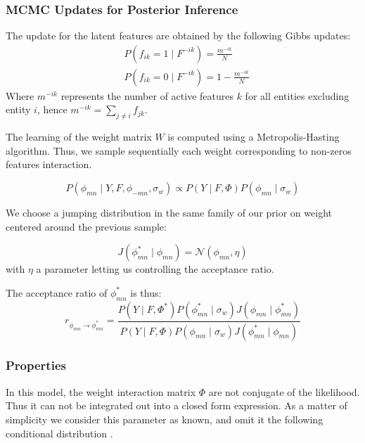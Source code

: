 \subsubsection{MCMC Updates for Posterior Inference}

The update for the latent features are obtained by the following Gibbs updates:
\begin{align}
& P(f_{ik} = 1 \mid F^{-ik}) = \frac{m^{-ik}}{N} \\
& P(f_{ik} = 0 \mid F^{-ik}) = 1 - \frac{m^{-ik}}{N}
\end{align}
Where $m^{-ik}$ represents the number of active features $k$ for all entities excluding entity $i$, hence $m^{-ik} = \sum_{j\neq i}f_{jk}$. 

The learning of the weight matrix $W$ is computed using a Metropolis-Hasting algorithm. Thus, we sample sequentially each weight corresponding to non-zeros features interaction.

\begin{equation}
P(\phi_{mn} \mid Y, F, \phi_{-mn}, \sigma_w) \propto P(Y \mid F, \Phi) P(\phi_{mn} \mid \sigma_w)
\end{equation}

We choose a jumping distribution in the same family of our prior on weight centered around the previous sample:

\begin{equation} \label{eq:j_w}
J(\phi_{mn}^* \mid \phi_{mn}) = \mathcal{N}(\phi_{mn}, \eta)
\end{equation}
with $\eta$ a parameter letting us controlling the acceptance ratio.

The acceptance ratio of $\phi_{mn}^*$ is thus:
\begin{equation} \label{eq:r_w}
r_{\phi_{mn}\rightarrow \phi_{mn}^*} = \frac{ P(Y \mid F, \Phi^*)P(\phi_{mn}^* \mid \sigma_w)J(\phi_{mn} \mid \phi_{mn}^*) }{ P(Y \mid F, \Phi)P(\phi_{mn} \mid \sigma_w)J(\phi_{mn}^* \mid \phi_{mn} )}
\end{equation}

\subsubsection{Properties}

In this model, the weight interaction matrix $\Phi$ are not conjugate of the likelihood. Thus it can not be integrated out into a closed form expression. As a matter of simplicity we consider this parameter as known, and omit it the following conditional distribution .

